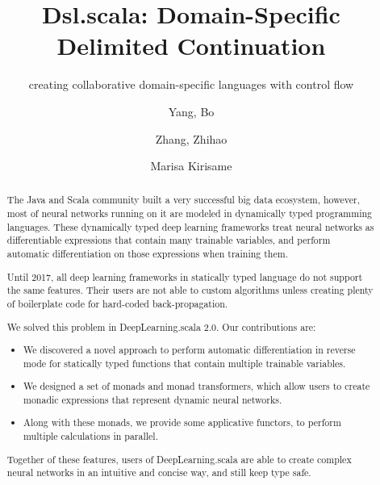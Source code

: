 \documentclass[acmsmall,10pt,review,screen,anonymous]{acmart}
\begin{document}
\title{Dsl.scala: Domain-Specific Delimited Continuation}
\subtitle{creating collaborative domain-specific languages with control flow}

\author{Yang, Bo}
\author{Zhang, Zhihao}
\author{Marisa Kirisame} 

\begin{abstract}
The Java and Scala community built a very successful big data ecosystem, however, most of neural networks running on it are modeled in dynamically typed programming languages. These dynamically typed deep learning frameworks treat neural networks as differentiable expressions that contain many \glspl{trainable variable}, and perform automatic differentiation on those expressions when training them.

Until 2017, all deep learning frameworks in statically typed language do not support the same features. Their users are not able to custom algorithms unless creating plenty of boilerplate code for hard-coded back-propagation.

We solved this problem in DeepLearning.scala 2.0. Our contributions are:

\begin{itemize}
  \item We discovered a novel approach to perform automatic differentiation in reverse mode for statically typed functions that contain multiple \glspl{trainable variable}.
  \item We designed a set of monads and monad transformers, which allow users to create monadic expressions that represent dynamic neural networks.
  \item Along with these monads, we provide some applicative functors, to perform multiple calculations in parallel.
\end{itemize}

Together of these features, users of DeepLearning.scala are able to create complex neural networks in an intuitive and concise way, and still keep type safe.
\end{abstract}
\end{document}
